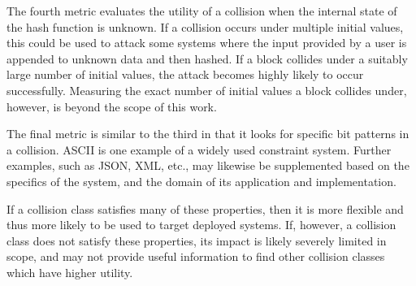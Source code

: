 \documentclass[conference]{IEEEtran}
\begin{document}
The fourth metric evaluates the utility of a collision when the internal state
of the hash function is unknown. If a collision occurs under multiple initial
values, this could be used to attack some systems where the input
provided by a user is
appended to unknown data and then hashed. If a block collides under a suitably
large number of initial values, the attack becomes highly likely to occur
successfully. Measuring the exact number of initial values a block
collides under, however, is beyond the scope of this work.

The final metric is similar to the third in that it looks for specific bit
patterns in a collision. ASCII is one example of a widely used constraint
system. Further examples, such as JSON, XML, etc., may likewise be
supplemented based on the specifics of the system, and the domain of
its application and implementation.

If a collision class satisfies many of these properties, then it is more
flexible and thus more likely to be used to target deployed systems. If,
however, a collision class does not satisfy these properties, its impact is
likely severely limited in scope, and may not provide useful information to
find other collision classes which have higher utility.
\end{document}
